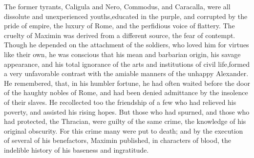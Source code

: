 The former tyrants, Caligula and Nero, Commodus, and Caracalla,
were all dissolute and unexperienced youths,\footnotemark[7] educated in the
purple, and corrupted by the pride of empire, the luxury of Rome,
and the perfidious voice of flattery. The cruelty of Maximin was
derived from a different source, the fear of contempt. Though he
depended on the attachment of the soldiers, who loved him for
virtues like their own, he was conscious that his mean and
barbarian origin, his savage appearance, and his total ignorance
of the arts and institutions of civil life,\footnotemark[8] formed a very
unfavorable contrast with the amiable manners of the unhappy
Alexander. He remembered, that, in his humbler fortune, he had
often waited before the door of the haughty nobles of Rome, and
had been denied admittance by the insolence of their slaves. He
recollected too the friendship of a few who had relieved his
poverty, and assisted his rising hopes. But those who had
spurned, and those who had protected, the Thracian, were guilty
of the same crime, the knowledge of his original obscurity. For
this crime many were put to death; and by the execution of
several of his benefactors, Maximin published, in characters of
blood, the indelible history of his baseness and ingratitude.\footnotemark[9]




